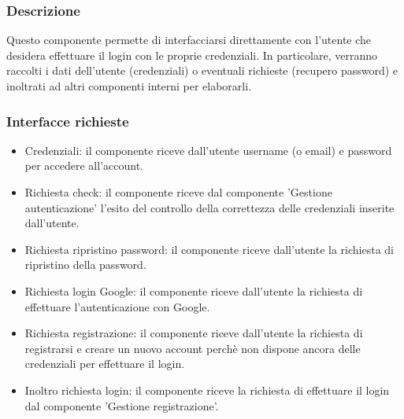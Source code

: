 \documentclass[a4paper,12pt]{article}
\begin{document}
\subsubsection*{Descrizione}
Questo componente permette di interfacciarsi direttamente con l’utente che desidera effettuare il login con le proprie credenziali. In particolare, verranno raccolti i dati dell’utente (credenziali) o eventuali richieste (recupero password) e inoltrati ad altri componenti interni per elaborarli.

\subsubsection*{Interfacce richieste}
\begin{itemize} \setlength\itemsep{0.01em}
\item {\sffamily Credenziali}: il componente riceve dall'utente username (o email) e password per accedere all'account.
\item {\sffamily Richiesta check}: il componente riceve dal componente 'Gestione autenticazione' l'esito del controllo della correttezza delle credenziali inserite dall'utente.
\item {\sffamily Richiesta ripristino password}: il componente riceve dall'utente la richiesta di ripristino della password.
\item {\sffamily Richiesta login Google}: il componente riceve dall'utente la richiesta di effettuare l'autenticazione con Google.
\item {\sffamily Richiesta registrazione}: il componente riceve dall'utente la richiesta di registrarsi e creare un nuovo account perchè non dispone ancora delle credenziali per effettuare il login.
\item {\sffamily Inoltro richiesta login}: il componente riceve la richiesta di effettuare il login dal componente 'Gestione registrazione'.
\end{itemize}
\end{document}
